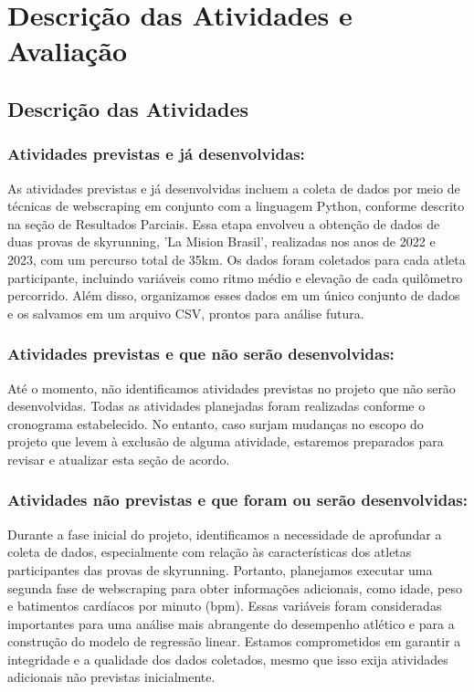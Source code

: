 \section{Descrição das Atividades e Avaliação}
\subsection{Descrição das Atividades}
\subsubsection{Atividades previstas e já desenvolvidas:}

As atividades previstas e já desenvolvidas incluem a coleta de dados por meio de técnicas de webscraping em conjunto com a linguagem Python, conforme descrito na seção de Resultados Parciais. Essa etapa envolveu a obtenção de dados de duas provas de skyrunning, 'La Mision Brasil', realizadas nos anos de 2022 e 2023, com um percurso total de 35km. Os dados foram coletados para cada atleta participante, incluindo variáveis como ritmo médio e elevação de cada quilômetro percorrido. Além disso, organizamos esses dados em um único conjunto de dados e os salvamos em um arquivo CSV, prontos para análise futura.

\subsubsection{Atividades previstas e que não serão desenvolvidas:}

Até o momento, não identificamos atividades previstas no projeto que não serão desenvolvidas. Todas as atividades planejadas foram realizadas conforme o cronograma estabelecido. No entanto, caso surjam mudanças no escopo do projeto que levem à exclusão de alguma atividade, estaremos preparados para revisar e atualizar esta seção de acordo.

\subsubsection{Atividades não previstas e que foram ou serão desenvolvidas:}

Durante a fase inicial do projeto, identificamos a necessidade de aprofundar a coleta de dados, especialmente com relação às características dos atletas participantes das provas de skyrunning. Portanto, planejamos executar uma segunda fase de webscraping para obter informações adicionais, como idade, peso e batimentos cardíacos por minuto (bpm). Essas variáveis foram consideradas importantes para uma análise mais abrangente do desempenho atlético e para a construção do modelo de regressão linear. Estamos comprometidos em garantir a integridade e a qualidade dos dados coletados, mesmo que isso exija atividades adicionais não previstas inicialmente.

